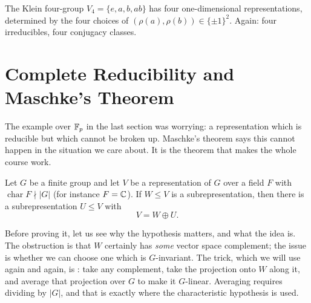 \documentclass[a4paper]{scrartcl}
\begin{document}
\begin{example}[$C_2 \times C_2$]
	The Klein four-group $V_4 = \{e, a, b, ab\}$ has four one-dimensional representations, determined by the four choices of $(\rho(a), \rho(b)) \in \{\pm 1\}^2$. Again: four irreducibles, four conjugacy classes.
\end{example}

\section{Complete Reducibility and Maschke's Theorem}

The example over $\mathbb{F}_p$ in the last section was worrying: a representation which is reducible but which cannot be broken up. Maschke's theorem says this cannot happen in the situation we care about. It is the theorem that makes the whole course work.

\begin{theorem}
	Let $G$ be a finite group and let $V$ be a representation of $G$ over a field $F$ with $\operatorname{char} F \nmid |G|$ (for instance $F = \mathbb{C}$). If $W \leq V$ is a subrepresentation, then there is a subrepresentation $U \leq V$ with
	$$V = W \oplus U.$$
\end{theorem}

Before proving it, let us see why the hypothesis matters, and what the idea is. The obstruction is that $W$ certainly has \emph{some} vector space complement; the issue is whether we can choose one which is $G$-invariant. The trick, which we will use again and again, is : take any complement, take the projection onto $W$ along it, and average that projection over $G$ to make it $G$-linear. Averaging requires dividing by $|G|$, and that is exactly where the characteristic hypothesis is used.
\end{document}
